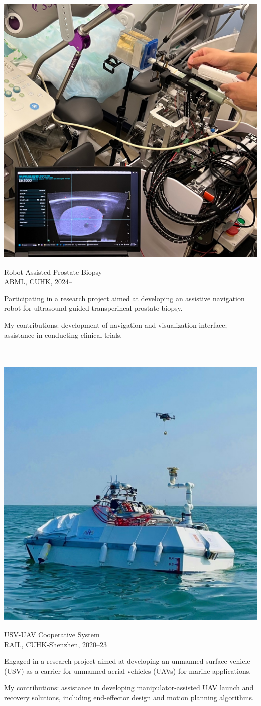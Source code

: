 \documentclass[11pt,letterpaper]{report}
\newcommand{\listitemspace}{0.25em}
\renewenvironment{itemize}
{\begin{list}{}{\setlength{\leftmargin}{0em}
			\setlength{\parskip}{0em}
			\setlength{\itemsep}{\listitemspace}
			\setlength{\parsep}{\listitemspace}}}
	{\end{list}}
\begin{document}
\includegraphics[width=0.22\linewidth, valign=T]{img/prostate-biopsy}\hfill
\begin{minipage}[t]{0.75\linewidth}
	\vspace{0pt}\par
	\begin{itemize}
		\item Robot-Assisted Prostate Biopsy\\ABML, CUHK, 2024--
		\item Participating in a research project aimed at developing an assistive navigation robot for ultrasound-guided transperineal prostate biopsy.
		\item My contributions: development of navigation and visualization interface; assistance in conducting clinical trials. 
	\end{itemize}
\end{minipage}\\~\\

\includegraphics[width=0.22\linewidth, valign=T]{img/usv-uav}\hfill
\begin{minipage}[t]{0.75\linewidth}
	\vspace{0pt}\par
	\begin{itemize}
			\item USV-UAV Cooperative System\\RAIL, CUHK-Shenzhen, 2020--23
			\item Engaged in a research project aimed at developing an unmanned surface vehicle (USV) as a carrier for unmanned aerial vehicles (UAVs) for marine applications.
			\item My contributions: assistance in developing manipulator-assisted UAV launch and recovery solutions, including end-effector design and motion planning algorithms.
		\end{itemize}
\end{minipage}
\end{document}
